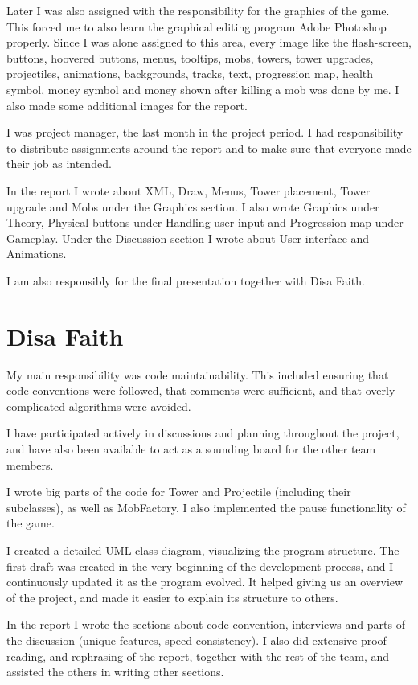 Later I was also assigned with the responsibility for the graphics of the game. This forced me to also learn the graphical editing program Adobe Photoshop properly. Since I was alone assigned to this area, every image like the flash-screen, buttons, hoovered buttons, menus, tooltips, mobs, towers, tower upgrades, projectiles, animations, backgrounds, tracks, text, progression map, health symbol, money symbol and money shown after killing a mob was done by me. I also made some additional images for the report. 

I was project manager, the last month in the project period. I had responsibility to distribute assignments around the report and to make sure that everyone made their job as intended.   

In the report I wrote about XML, Draw, Menus, Tower placement, Tower upgrade and Mobs under the Graphics section. I also wrote Graphics under Theory, Physical buttons under Handling user input and Progression map under Gameplay. Under the Discussion section I wrote about User interface and Animations.

I am also responsibly for the final presentation together with Disa Faith.


\section{Disa Faith}

My main responsibility was code maintainability. This included ensuring that code conventions were followed, that comments were sufficient, and that overly complicated algorithms were avoided. 

I have participated actively in discussions and planning throughout the project, and have also been available to act as a sounding board for the other team members.

I wrote big parts of the code for Tower and Projectile (including their subclasses), as well as MobFactory. I also implemented the pause functionality of the game.

I created a detailed UML class diagram, visualizing the program structure. The first draft was created in the very beginning of the development process, and I continuously updated it as the program evolved. It helped giving us an overview of the project, and made it easier to explain its structure to others.

In the report I wrote the sections about code convention, interviews and parts of the discussion (unique features, speed consistency). I also did extensive proof reading, and rephrasing of the report, together with the rest of the team, and assisted the others in writing other sections.

